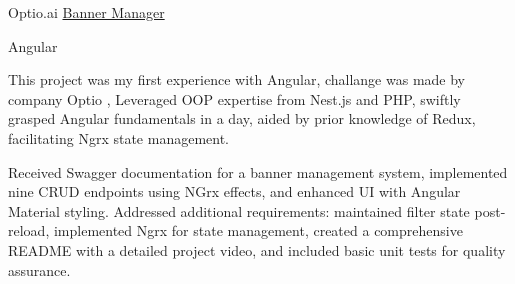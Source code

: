 \documentclass[10pt]{article}
\begin{document}
{    
   
    
    
  
    \job
    {\small Optio.ai}
    {\href{https://github.com/vindexTOS/banner_manager_angular}{Banner Manager}}

    {\small Angular}
  
    {  
        \begin{newitemize}
      

 
        \item \footnotesize This project was my first experience with Angular, challange was made by company Optio , Leveraged OOP expertise from Nest.js and PHP, swiftly grasped Angular fundamentals in a day, aided by prior knowledge of Redux, facilitating Ngrx state management.
       \item \footnotesize Received Swagger documentation for a banner management system, implemented nine CRUD endpoints using NGrx effects, and enhanced UI with Angular Material styling. Addressed additional requirements: maintained filter state post-reload, implemented Ngrx for state management, created a comprehensive README with a detailed project video, and included basic unit tests for quality assurance.


    \end{newitemize}}

    }\
 

   
     
\end{document}
